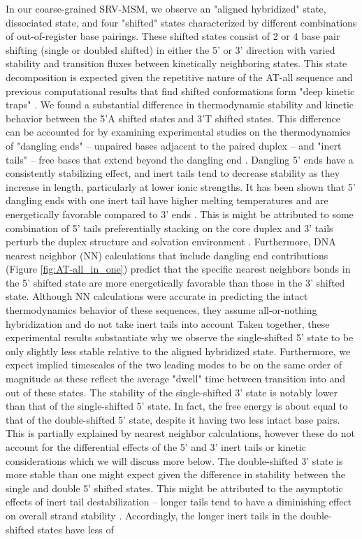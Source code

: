 \documentclass[journal=jpcbfk,manuscript=article]{achemso}
\begin{document}
In our coarse-grained SRV-MSM, we observe an "aligned hybridized" state, dissociated state, and four "shifted" states characterized by different combinations of out-of-register base pairings. These shifted states consist of 2 or 4 base pair shifting (single or doubled shifted) in either the 5' or 3' direction with varied stability and transition fluxes between kinetically neighboring states. This state decomposition is expected given the repetitive nature of the AT-all sequence and previous computational results that find shifted conformations form "deep kinetic traps" \citep{Xiao2019, Phys2014}. We found a substantial difference in thermodynamic stability and kinetic behavior between the 5'A shifted states and 3'T shifted states. This difference can be accounted for by examining experimental studies on the thermodynamics of "dangling ends" -- unpaired bases adjacent to the paired duplex -- and "inert tails" -- free bases that extend beyond the dangling end \citep{Michele2014EHybridization}. Dangling 5' ends have a consistently stabilizing effect, and inert tails tend to decrease stability as they increase in length, particularly at lower ionic strengths. It has been shown that 5' dangling ends with one inert tail have higher melting temperatures and are energetically favorable compared to 3' ends \citep{Senior1988InfluenceDuplexes, Dickman2012ThermodynamicDNAs}. This is might be attributed to some combination of 5' tails preferentially stacking on the core duplex and 3' tails perturb the duplex structure and solvation environment \citep{Doktycz1990ThermodynamicATGC}. Furthermore, DNA nearest neighbor (NN) calculations that include dangling end contributions (Figure \ref{fig:AT-all_in_one}) predict that the specific nearest neighbors bonds in the 5' shifted state are more energetically favorable than those in the 3' shifted state. Although NN calculations were accurate in predicting the intact thermodynamics behavior of these sequences, they assume all-or-nothing hybridization and do not take inert tails into account \citep{Santalucia2004TM, SantaLucia1998AThermodynamics} Taken together, these experimental results substantiate why we observe the single-shifted 5' state to be only slightly less stable relative to the aligned hybridized state. Furthermore, we expect implied timescales of the two leading modes to be on the same order of magnitude as these reflect the average "dwell" time between transition into and out of these states. The stability of the single-shifted 3' state is notably lower than that of the single-shifted 5' state. In fact, the free energy is about equal to that of the double-shifted 5' state, despite it having two less intact base pairs. This is partially explained by nearest neighbor calculations, however these do not account for the differential effects of the 5' and 3' inert tails or kinetic considerations which we will discuss more below. The double-shifted 3' state is more stable than one might expect given the difference in stability between the single and double 5' shifted states. This might be attributed to the asymptotic effects of inert tail destabilization -- longer tails tend to have a diminishing effect on overall strand stability \citep{Michele2014EHybridization}. Accordingly, the longer inert tails in the double-shifted states have less of 
\end{document}
